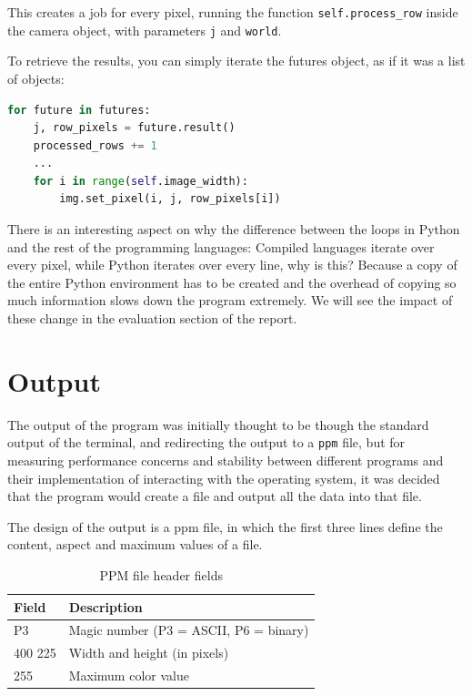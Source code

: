 This creates a job for every pixel, running the function \texttt{self.process\_row} inside the camera object, with parameters \texttt{j} and \texttt{world}.

To retrieve the results, you can simply iterate the futures object, as if it was a list of objects:
\begin{lstlisting}[language=Python, caption={Python retieving data from Process execution pool.}, label={lst:python_executor_retrieve}]
for future in futures:
    j, row_pixels = future.result()
    processed_rows += 1
    ...
    for i in range(self.image_width):
        img.set_pixel(i, j, row_pixels[i])
\end{lstlisting}


There is an interesting aspect on why the difference between the loops in Python and the rest of the programming languages: Compiled languages iterate over every pixel, while Python iterates over every line, why is this? Because a copy of the entire Python environment has to be created and the overhead of copying so much information slows down the program extremely. We will see the impact of these change in the evaluation section of the report.

\section{Output}
\label{sec:output}
The output of the program was initially thought to be though the standard output of the terminal, and redirecting the output to a \texttt{\gls{ppm}} file, but for measuring performance concerns and stability between different programs and their implementation of interacting with the operating system, it was decided that the program would create a file and output all the data into that file.

The design of the output is a \gls{ppm} file, in which the first three lines define the content, aspect and maximum values of a file. 
\begin{table}[H]
  \begin{tabular}{@{}ll@{}}
    \toprule
    Field        & Description                                 \\
    \midrule
    P3           & Magic number (P3 = ASCII, P6 = binary)      \\
    400 225      & Width and height (in pixels)                \\
    255          & Maximum color value                         \\
    \bottomrule
  \end{tabular}
  \caption{PPM file header fields}
  \label{tab:ppm-header}
\end{table}

